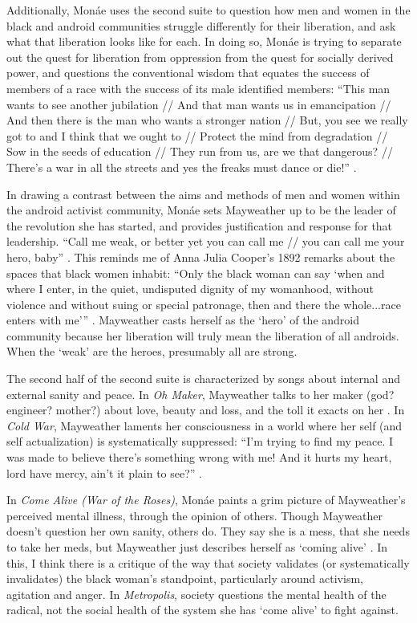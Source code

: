 \documentclass[a4paper, 11pt]{article} %
\begin{document}
Additionally, Mon\'ae uses the second suite to question how men and women in the black and android communities struggle differently for their liberation, and ask what that liberation looks like for each.
In doing so, Mon\'ae is trying to separate out the quest for liberation from oppression from the quest for socially derived power, and questions the conventional wisdom that equates the success of members of a race with the success of its male identified members:
``This man wants to see another jubilation //
And that man wants us in emancipation //
And then there is the man who wants a stronger nation //
But, you see we really got to and I think that we ought to //
Protect the mind from degradation //
Sow in the seeds of education //
They run from us, are we that dangerous? //
There's a war in all the streets and yes the freaks must dance or die!'' \cite{danceordie}.

In drawing a contrast between the aims and methods of men and women within the android activist community, Mon\'ae sets Mayweather up to be the leader of the revolution she has started, and provides justification and response for that leadership.
``Call me weak, or better yet you can call me // you can call me your hero, baby'' \cite{faster}.
This reminds me of Anna Julia Cooper's 1892 remarks about the spaces that black women inhabit:
``Only the black woman can say `when and where I enter, in the quiet, undisputed dignity of my womanhood, without violence and without suing or special patronage, then and there the whole...race enters with me''' \cite{cooper1892}.
Mayweather casts herself as the `hero' of the android community because her liberation will truly mean the liberation of all androids.
When the `weak' are the heroes, presumably all are strong.

The second half of the second suite is characterized by songs about internal and external sanity and peace.
In \emph{Oh Maker}, Mayweather talks to her maker (god? engineer? mother?) about love, beauty and loss, and the toll it exacts on her \cite{ohmaker}.
In \emph{Cold War}, Mayweather laments her consciousness in a world where her self (and self actualization) is systematically suppressed:
``I'm trying to find my peace.  I was made to believe there's something wrong with me! And it hurts my heart, lord have mercy, ain't it plain to see?'' \cite{coldwar}. 

In \emph{Come Alive (War of the Roses)}, Mon\'ae paints a grim picture of Mayweather's perceived mental illness, through the opinion of others.
Though Mayweather doesn't question her own sanity, others do.  
They say she is a mess, that she needs to take her meds, but Mayweather just describes herself as `coming alive' \cite{roses}.
In this, I think there is a critique of the way that society validates (or systematically invalidates) the black woman's standpoint, particularly around activism, agitation and anger.
In \emph{Metropolis}, society questions the mental health of the radical, not the social health of the system she has `come alive' to fight against.
\end{document}
